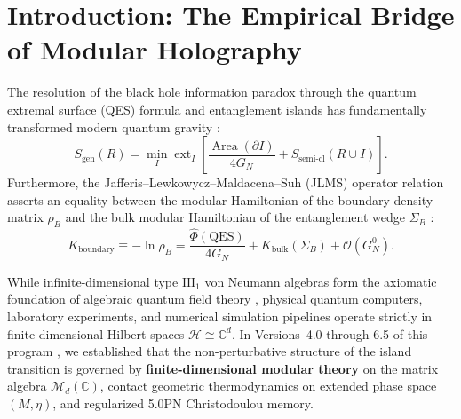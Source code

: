 \documentclass[11pt,a4paper,reqno]{article}
\theoremstyle{definition}
\numberwithin{equation}{section}
\begin{document}
\begin{abstract}
\begin{enumerate}
    \item \textbf{3D Kerr Circumbinary Contact Dynamics:} We generalize contact geometric integrators to non-vacuum astrophysical environments, coupling binary trajectories to Bondi--Hoyle gas accretion drag, tidal quadrupole deformations (Love numbers $\tilde{\Lambda}$), and Kerr frame dragging in active galactic nuclei discs.
\end{enumerate}
All empirical benchmarks, circuit codes, and data streams are released under open CC-BY-4.0 licensing with cryptographic SHA-256 provenance verification.
\end{abstract}

\newpage
\tableofcontents
\newpage

\section{Introduction: The Empirical Bridge of Modular Holography}
\label{sec:intro}

The resolution of the black hole information paradox through the quantum extremal surface (QES) formula and entanglement islands has fundamentally transformed modern quantum gravity \cite{Almheiri2019, Penington2020, Akers2021}:
\begin{equation}
S_{\text{gen}}(R) = \min_I \operatorname{ext}_I \left[ \frac{\operatorname{Area}(\partial I)}{4 G_N} + S_{\text{semi-cl}}(R \cup I) \right].
\label{eq:island_formula}
\end{equation}
Furthermore, the Jafferis--Lewkowycz--Maldacena--Suh (JLMS) operator relation asserts an equality between the modular Hamiltonian of the boundary density matrix $\rho_B$ and the bulk modular Hamiltonian of the entanglement wedge $\Sigma_B$ \cite{Jafferis2016}:
\begin{equation}
K_{\mathrm{boundary}} \equiv -\ln \rho_B = \frac{\hat{\Phi}(\mathrm{QES})}{4 G_N} + K_{\mathrm{bulk}}(\Sigma_B) + \mathcal{O}(G_N^0).
\label{eq:jlms_identity_clean}
\end{equation}

While infinite-dimensional type $\mathrm{III}_1$ von Neumann algebras form the axiomatic foundation of algebraic quantum field theory \cite{Haag1996}, physical quantum computers, laboratory experiments, and numerical simulation pipelines operate strictly in finite-dimensional Hilbert spaces $\mathcal{H} \cong \mathbb{C}^d$. In Versions~4.0 through 6.5 of this program \cite{ZenodoV4, ZenodoV5, ZenodoV65, ZenodoV6Software, ZenodoV6Automata}, we established that the non-perturbative structure of the island transition is governed by \textbf{finite-dimensional modular theory} on the matrix algebra $\mathcal{M}_d(\mathbb{C})$, contact geometric thermodynamics on extended phase space $(M, \eta)$, and regularized 5.0PN Christodoulou memory.
\end{document}
